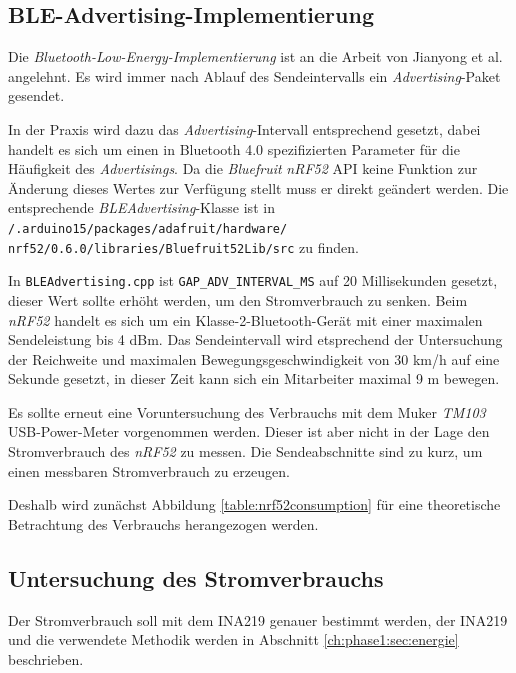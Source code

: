 \subsection{BLE-Advertising-Implementierung}
\label{ch:phase3:sec:advertising}
Die \emph{Bluetooth-Low-Energy-Implementierung} ist an die Arbeit von Jianyong et al. angelehnt.
Es wird immer nach Ablauf des Sendeintervalls ein \emph{Advertising}-Paket gesendet.

In der Praxis wird dazu das \emph{Advertising}-Intervall entsprechend gesetzt, dabei handelt es sich um einen in Bluetooth 4.0 spezifizierten Parameter für die Häufigkeit des \emph{Advertisings}.
Da die \emph{Bluefruit} \emph{nRF52} API keine Funktion zur Änderung dieses Wertes zur Verfügung stellt muss er direkt geändert werden.
Die entsprechende \emph{BLEAdvertising}-Klasse ist in \texttt{/.arduino15/packages/adafruit/hardware/}\\\texttt{nrf52/0.6.0/libraries/Bluefruit52Lib/src} zu finden.

In \texttt{BLEAdvertising.cpp} ist \texttt{GAP\_ADV\_INTERVAL\_MS} auf 20 Millisekunden gesetzt, dieser Wert sollte erhöht werden, um den Stromverbrauch zu senken.
Beim \emph{nRF52} handelt es sich um ein Klasse-2-Bluetooth-Gerät mit einer maximalen Sendeleistung bis 4 dBm.
Das Sendeintervall wird etsprechend der Untersuchung der Reichweite und maximalen Bewegungsgeschwindigkeit von 30 km/h auf eine Sekunde gesetzt, in dieser Zeit kann sich ein Mitarbeiter maximal 9 m bewegen.

Es sollte erneut eine Voruntersuchung des Verbrauchs mit dem Muker \emph{TM103} USB-Power-Meter vorgenommen werden.
Dieser ist aber nicht in der Lage den Stromverbrauch des \emph{nRF52} zu messen.
Die Sendeabschnitte sind zu kurz, um einen messbaren Stromverbrauch zu erzeugen.

Deshalb wird zunächst Abbildung \ref{table:nrf52consumption} für eine theoretische Betrachtung des Verbrauchs herangezogen werden.




\subsection{Untersuchung des Stromverbrauchs}
Der Stromverbrauch soll mit dem INA219 genauer bestimmt werden, der INA219 und die verwendete Methodik werden in Abschnitt \ref{ch:phase1:sec:energie} beschrieben.

